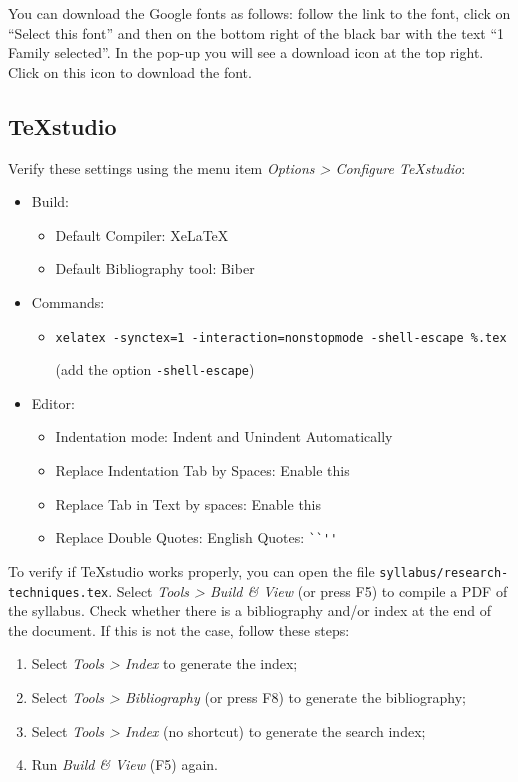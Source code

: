 You can download the Google fonts as follows: follow the link to the font, click on ``Select this font'' and then on the bottom right of the black bar with the text ``1 Family selected''. In the pop-up you will see a download icon at the top right. Click on this icon to download the font.

\subsection{TeXstudio}

Verify these settings using the menu item \emph{Options > Configure TeXstudio}:

\begin{itemize}
    \item Build:
    \begin{itemize}
        \item Default Compiler: XeLaTeX
        \item Default Bibliography tool: Biber
    \end{itemize}
    \item Commands:
    \begin{itemize}
        \item \texttt{xelatex -synctex=1 -interaction=nonstopmode  -shell-escape \%.tex}
        
        (add the option \texttt{-shell-escape})
    \end{itemize}
    \item Editor:
    \begin{itemize}
        \item Indentation mode: Indent and Unindent Automatically
        \item Replace Indentation Tab by Spaces: Enable this
        \item Replace Tab in Text by spaces: Enable this
        \item Replace Double Quotes: English Quotes: \verb|``''|
    \end{itemize}
    
\end{itemize}

To verify if TeXstudio works properly, you can open the file \texttt{syllabus/research-techniques.tex}. 
Select \emph{Tools > Build \& View} (or press F5) to compile a PDF of the syllabus. 
Check whether there is a bibliography and/or index at the end of the document. 
If this is not the case, follow these steps:

\begin{enumerate}
    \item Select \emph{Tools > Index} to generate the index;
    \item Select \emph{Tools > Bibliography} (or press F8) to generate the bibliography;
    \item Select \emph{Tools > Index} (no shortcut) to generate the search index;
    \item Run \emph{Build \& View} (F5) again.
\end{enumerate}

